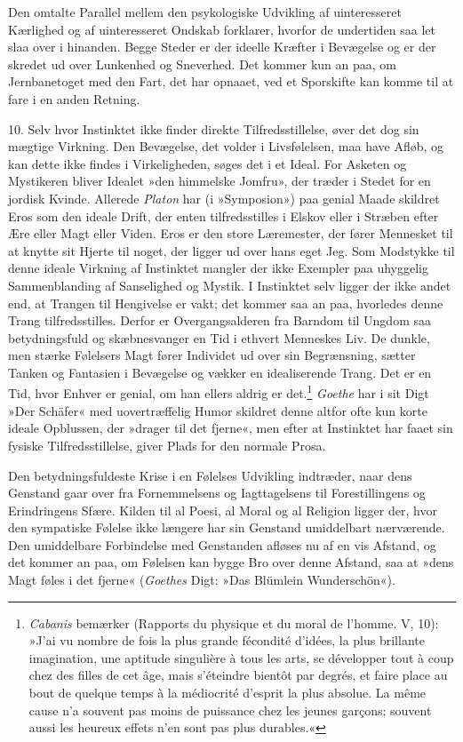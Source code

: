 \documentclass[12pt,a4paper,openany]{book}
\newcommand{\opage}[1]{\marginnote{\footnotesize\textit{[#1]}}}
\begin{document}
Den omtalte Parallel mellem den psykologiske Udvikling af uinteresseret
Kærlighed og af uinteresseret Ondskab forklarer, hvorfor de undertiden
saa let slaa over i hinanden. Begge Steder er der ideelle Kræfter i
Bevægelse og er der skredet ud over Lunkenhed og Sneverhed. Det kommer
kun an paa, om Jernbanetoget med den Fart, det har opnaaet, ved et
Sporskifte kan komme til at fare i en anden Retning.

10. Selv hvor Instinktet ikke finder direkte Tilfredsstillelse, øver det
dog sin mægtige Virkning. Den Bevægelse, det volder i Livsfølelsen, maa
have Afløb, og kan dette ikke findes i Virkeligheden, søges det i et
Ideal. For Asketen og Mystikeren bliver Idealet »den himmelske Jomfru»,
der træder i Stedet for en jordisk Kvinde. Allerede \emph{Platon} har (i
»Symposion») paa genial Maade skildret Eros som den ideale Drift, der
enten tilfredsstilles i Elskov eller i Stræben efter Ære eller Magt
eller Viden. Eros er den store Læremester, der fører Mennesket til at
knytte sit Hjerte til noget, der ligger
\opage{304}ud over hans eget Jeg. Som Modstykke til denne ideale
Virkning af Instinktet mangler der ikke Exempler paa uhyggelig
Sammenblanding af Sanselighed og Mystik. I Instinktet selv ligger der
ikke andet end, at Trangen til Hengivelse er vakt; det kommer saa an
paa, hvorledes denne Trang tilfredsstilles. Derfor er Overgangsalderen
fra Barndom til Ungdom saa betydningsfuld og skæbnesvanger en Tid i
ethvert Menneskes Liv. De dunkle, men stærke Følelsers Magt fører
Individet ud over sin Begrænsning, sætter Tanken og Fantasien i
Bevægelse og vækker en idealiserende Trang. Det er en Tid, hvor Enhver
er genial, om han ellers aldrig er det.\footnote[1]{\emph{Cabanis}
bemærker (Rapports du physique et du moral de l’homme. V, 10): »J’ai vu
nombre de fois la plus grande fécondité d’idées, la plus brillante
imagination, une aptitude singulière à tous les arts, se développer tout
à coup chez des filles de cet âge, mais s’éteindre bientôt par degrés,
et faire place au bout de quelque temps à la médiocrité d’esprit la plus
absolue. La même cause n’a souvent pas moins de puissance chez les
jeunes garçons; souvent aussi les heureux effets n’en sont pas plus
durables.«} \emph{Goethe} har i sit Digt »Der Schäfer« med
uovertræffelig Humor skildret denne altfor ofte kun korte ideale
Opblussen, der »drager til det fjerne«, men efter at Instinktet har
faaet sin fysiske Tilfredsstillelse, giver Plads for den normale Prosa.

Den betydningsfuldeste Krise i en Følelses Udvikling indtræder, naar
dens Genstand gaar over fra Fornemmelsens og Iagttagelsens til
Forestillingens og Erindringens Sfære. Kilden til al Poesi, al Moral og
al Religion ligger der, hvor den sympatiske Følelse ikke længere har sin
Genstand umiddelbart nærværende. Den umiddelbare Forbindelse med
Genstanden afløses nu af en vis Afstand, og det kommer an paa, om
Følelsen kan bygge Bro over denne Afstand, saa at »dens Magt føles i det
fjerne« (\emph{Goethes} Digt: »Das Blümlein Wunderschön«).
\end{document}

